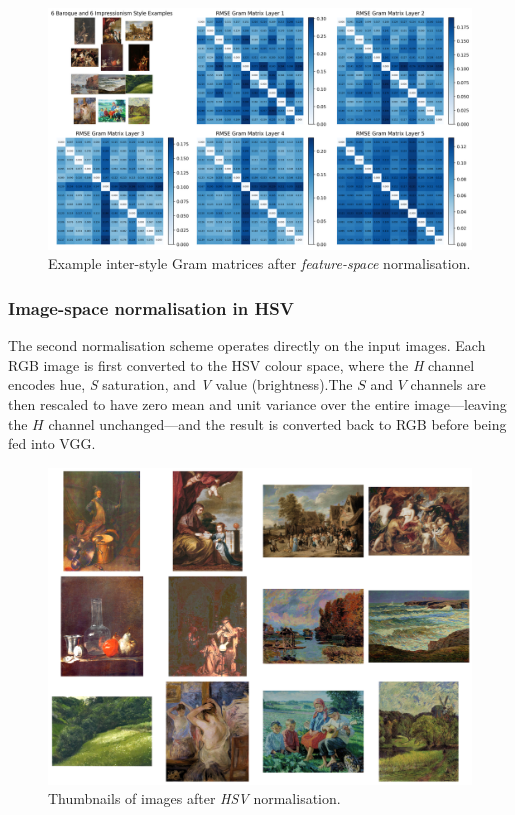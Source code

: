 \documentclass[a4paper,11pt]{article}
\begin{document}
\begin{figure}[htbp]
  \centering
  \includegraphics[width=\textwidth]{figures/rmse_featurenorm.png}
  \caption{Example inter-style Gram matrices after \emph{feature-space} normalisation.}
  \label{fig:gram_norm}
\end{figure}

\subsubsection{Image-space normalisation in HSV}
The second normalisation scheme operates directly on the input images. Each RGB image is first converted to the HSV colour space, where the \emph{H} channel encodes hue, \emph{S} saturation, and \emph{V} value (brightness).The \(S\) and \(V\) channels are then rescaled to have zero mean and unit variance over the entire image—leaving the \(H\) channel unchanged—and the result is converted back to RGB before being fed into VGG.

\begin{figure}[htbp]
  \centering
  \includegraphics[width=\textwidth]{figures/HSV_normalized.png}
  \caption{Thumbnails of images after \emph{HSV} normalisation.}
  \label{fig:hsv_examples}
\end{figure}
\end{document}
